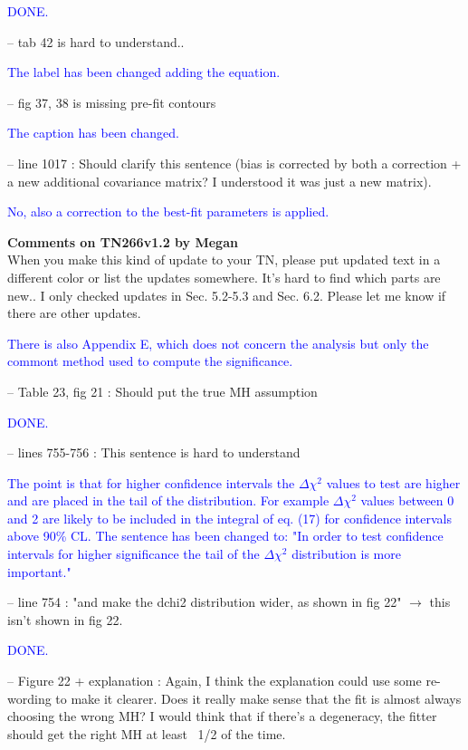 \documentclass[final]{elsarticle}
\begin{document}
\textcolor{blue}{DONE.}

-- tab 42 is hard to understand..

\textcolor{blue}{The label has been changed adding the equation.}

-- fig 37, 38 is missing pre-fit contours

\textcolor{blue}{The caption has been changed.}

-- line 1017 : Should clarify this sentence (bias is corrected by both a
correction + a new additional covariance matrix? I understood it was just a
new matrix).

\textcolor{blue}{No, also a correction to the best-fit parameters is applied.}


\newpage






{\Large \textbf{Comments on TN266v1.2 by Megan}} \\

When you make this kind of update to your TN, please put updated text in a
different color or list the updates somewhere.  It's hard to find which parts are new..
I only checked updates in Sec. 5.2-5.3 and Sec. 6.2.  Please let me know if
there are other updates.

\textcolor{blue}{There is also Appendix E, which does not concern the analysis
but only the commont method used to compute the significance.}

-- Table 23, fig 21 : Should put the true MH assumption

\textcolor{blue}{DONE.}

-- lines 755-756 : This sentence is hard to understand

\textcolor{blue}{
The point is that for higher confidence intervals the $\Delta \chi^2$ values to test are higher and 
are placed in the tail of the distribution. For example $\Delta \chi^2$ values between 0 and 2 
are likely to be included in the integral of eq. (17) for confidence intervals above 90\% CL.
The sentence has been changed to:
"In order to test confidence intervals for higher significance the tail of the $\Delta \chi^2$ distribution is more important."
}

-- line 754 : "and make the dchi2 distribution wider, as shown in fig 22" $\rightarrow$ this
isn't shown in fig 22.

\textcolor{blue}{DONE.}

-- Figure 22 + explanation : Again, I think the explanation could use some
re-wording to make it clearer.  Does it really make sense that the fit is
almost always choosing the wrong MH?  I would think that if there's a degeneracy,
the fitter should get the right MH at least ~1/2 of the time.
\end{document}
